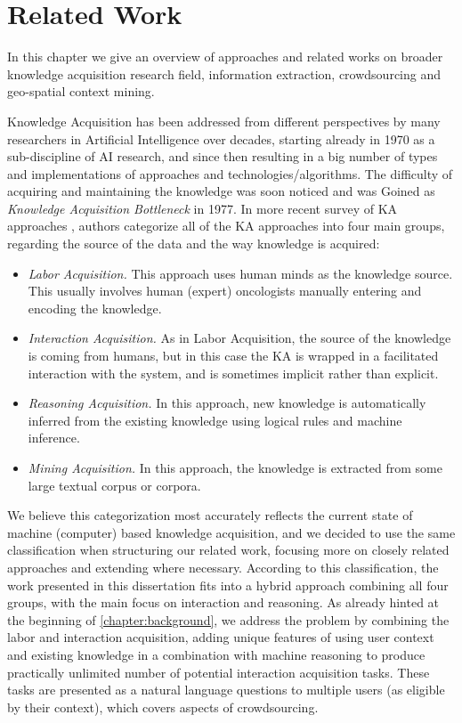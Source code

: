 \chapter{Related Work}
\label{chapter:related}
In this chapter we give an overview of approaches and related works on
broader knowledge acquisition research field, information extraction, 
crowdsourcing and geo-spatial context mining. 

Knowledge Acquisition has been addressed from different perspectives by many 
researchers in Artificial Intelligence over decades, starting already in 1970 
as a sub-discipline of AI research, and since then resulting in a big number of 
types and implementations of approaches and technologies/algorithms. The 
difficulty of acquiring and maintaining the knowledge was soon noticed and was 
Goined as \emph{Knowledge Acquisition Bottleneck} in 
1977\parencite{Feigenbaum1977}. In more recent survey of KA approaches 
\parencite{Zang2013}, authors categorize all of the KA approaches into four main
groups, regarding the source of the data and the way knowledge is acquired:
\begin{itemize}
	\item \emph{Labor Acquisition.} This approach uses human minds as the 
    knowledge source. This usually involves human (expert) oncologists manually 
    entering and encoding the knowledge.
	\item \emph{Interaction Acquisition.} As in Labor Acquisition, the source 
    of the knowledge is coming from humans, but in this case the KA is wrapped 
    in a facilitated interaction with the system, and is sometimes implicit 
    rather than explicit.
	\item \emph{Reasoning Acquisition.} In this approach, new knowledge is 
    automatically inferred from the existing knowledge using logical rules and 
    machine inference.
	\item \emph{Mining Acquisition.} In this approach, the knowledge is 
    extracted from some large textual corpus or corpora.
\end{itemize}

We believe this categorization most accurately reflects the current state of 
machine (computer) based knowledge acquisition, and we decided to use the same 
classification when structuring our related work, focusing more on closely 
related approaches and extending where necessary. According to this 
classification, the work presented in this dissertation fits into a hybrid 
approach combining all four groups, with the main focus on interaction and 
reasoning. As already hinted at the beginning of \autoref{chapter:background},
we address the problem by combining the labor and interaction acquisition, 
adding unique features of using user context and existing knowledge in a 
combination with machine reasoning to produce practically unlimited number of 
potential interaction acquisition tasks. These tasks are presented as a 
natural language questions to multiple users (as eligible by their context),
which covers aspects of crowdsourcing. 

